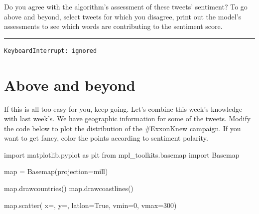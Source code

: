 \documentclass[
  letterpaper,
  DIV=11,
  numbers=noendperiod]{scrreprt}
\newenvironment{Shaded}{\begin{snugshade}}{\end{snugshade}}
\newcommand{\BuiltInTok}[1]{\textcolor[rgb]{0.00,0.23,0.31}{#1}}
\newcommand{\DecValTok}[1]{\textcolor[rgb]{0.68,0.00,0.00}{#1}}
\newcommand{\ImportTok}[1]{\textcolor[rgb]{0.00,0.46,0.62}{#1}}
\newcommand{\NormalTok}[1]{\textcolor[rgb]{0.00,0.23,0.31}{#1}}
\newcommand{\OperatorTok}[1]{\textcolor[rgb]{0.37,0.37,0.37}{#1}}
\newcommand{\StringTok}[1]{\textcolor[rgb]{0.13,0.47,0.30}{#1}}
\newcommand{\VariableTok}[1]{\textcolor[rgb]{0.07,0.07,0.07}{#1}}
\begin{document}
Do you agree with the algorithm's assessment of these tweets' sentiment?
To go above and beyond, select tweets for which you disagree, print out
the model's assessments to see which words are contributing to the
sentiment score.

\begin{center}\rule{0.5\linewidth}{0.5pt}\end{center}

\begin{Shaded}
\begin{Highlighting}[]

\end{Highlighting}
\end{Shaded}

\begin{verbatim}
KeyboardInterrupt: ignored
\end{verbatim}

\hypertarget{above-and-beyond}{%
\section{Above and beyond}\label{above-and-beyond}}

If this is all too easy for you, keep going. Let's combine this week's
knowledge with last week's. We have geographic information for some of
the tweets. Modify the code below to plot the distribution of the
\#ExxonKnew campaign. If you want to get fancy, color the points
according to sentiment polarity.

\begin{Shaded}
\begin{Highlighting}[]
\ImportTok{import}\NormalTok{ matplotlib.pyplot }\ImportTok{as}\NormalTok{ plt}
\ImportTok{from}\NormalTok{ mpl\_toolkits.basemap }\ImportTok{import}\NormalTok{ Basemap}

\BuiltInTok{map} \OperatorTok{=}\NormalTok{ Basemap(projection}\OperatorTok{=}\StringTok{\textquotesingle{}mill\textquotesingle{}}\NormalTok{)}

\BuiltInTok{map}\NormalTok{.drawcountries()}
\BuiltInTok{map}\NormalTok{.drawcoastlines()}

\BuiltInTok{map}\NormalTok{.scatter(}
\NormalTok{      x}\OperatorTok{=}\NormalTok{, }
\NormalTok{      y}\OperatorTok{=}\NormalTok{, }
\NormalTok{      latlon}\OperatorTok{=}\VariableTok{True}\NormalTok{, }
\NormalTok{      vmin}\OperatorTok{=}\DecValTok{0}\NormalTok{, }
\NormalTok{      vmax}\OperatorTok{=}\DecValTok{300}\NormalTok{)}
\end{Highlighting}
\end{Shaded}
\end{document}

